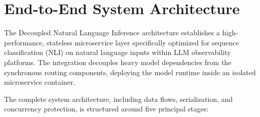 \documentclass[11pt,a4paper]{article}
\theoremstyle{plain}
\theoremstyle{definition}
\theoremstyle{remark}
\begin{document}
\section{End-to-End System Architecture}\label{sec:architecture}

The Decoupled Natural Language Inference architecture establishes a high-performance, stateless microservice layer specifically optimized for sequence classification (NLI) on natural language inputs within LLM observability platforms. The integration decouples heavy model dependencies from the synchronous routing components, deploying the model runtime inside an isolated microservice container. 

The complete system architecture, including data flows, serialization, and concurrency protection, is structured around five principal stages:
\end{document}
